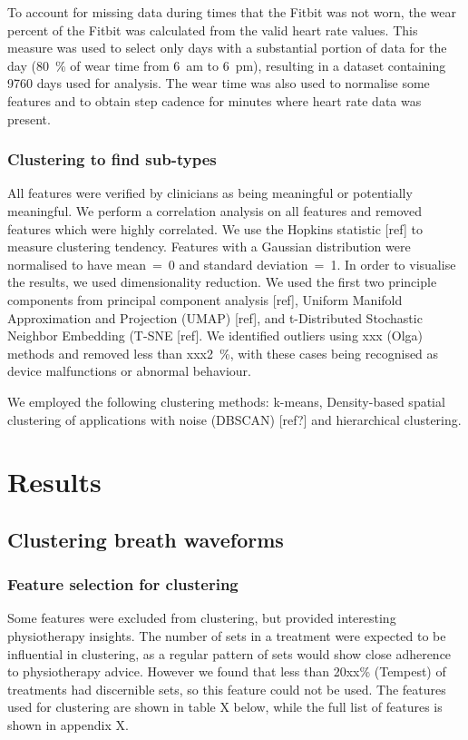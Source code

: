 \documentclass{article}
\begin{document}
To account for missing data during times that the Fitbit was not worn, the wear percent of the Fitbit was calculated from the valid heart rate values. This measure was used to select only days with a substantial portion of data for the day (80~\% of wear time from 6~am to 6~pm), resulting in a dataset containing 9760 days used for analysis. The wear time was also used to normalise some features and to obtain step cadence for minutes where heart rate data was present. 

\subsubsection{Clustering to find sub-types}  

All features were verified by clinicians as being meaningful or potentially meaningful. We perform a correlation analysis on all features and removed features which were highly correlated. We use the Hopkins statistic [ref] to measure clustering tendency. Features with a Gaussian distribution were normalised to have mean~=~0 and standard deviation~=~1. In order to visualise the results, we used dimensionality reduction. We used the first two principle components from principal component analysis [ref], Uniform Manifold Approximation and Projection (UMAP) [ref], and t-Distributed Stochastic Neighbor Embedding (T-SNE [ref]. We identified outliers using xxx (Olga) methods and removed less than xxx2~\%, with these cases being recognised as device malfunctions or abnormal behaviour.  

We employed the following clustering methods: k-means, Density-based spatial clustering of applications with noise (DBSCAN) [ref?] and hierarchical clustering.  

\section{Results}

\subsection{Clustering breath waveforms}

\subsubsection{Feature selection for clustering}

Some features were excluded from clustering, but provided interesting physiotherapy insights.  
The number of sets in a treatment were expected to be influential in clustering, as a regular pattern of sets would show close adherence to physiotherapy advice. However we found that less than 20xx\% (Tempest) of treatments had discernible sets, so this feature could not be used. The features used for clustering are shown in table X below, while the full list of features is shown in appendix X. 
\end{document}
